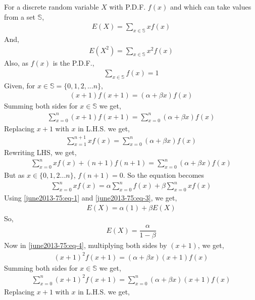For a discrete random variable $X$ with P.D.F. $f(x)$ and which can take values from a set $\mathbb{S}$,
\begin{align} \label{june2013-75:eq-1}
    E(X)= \sum_{x \in \mathbb{S}}xf(x)
\end{align}
And,
\begin{align} \label{june2013-75:eq-2}
    E(X^2) =\sum_{x \in \mathbb{S}}x^2f(x)
\end{align}
Also, as $f(x)$ is the P.D.F.,
\begin{align} \label{june2013-75:eq-3}
    \sum_{x \in \mathbb{S}}f(x) = 1
\end{align}
Given, for $x \in \mathbb{S}=\{0,1,2,...n\}$,
\begin{align} \label{june2013-75:eq-4}
    (x+1)f(x+1)=(\alpha + \beta x)f(x)
\end{align}
Summing both sides for $x \in \mathbb{S}$ we get,
\begin{align}
    \sum_{x=0}^n(x+1)f(x+1)=\sum_{x=0}^n(\alpha +\beta x)f(x)
\end{align}
Replacing $x+1$ with $x$ in L.H.S. we get, 
\begin{align}
    \sum_{x=1}^{n+1}xf(x)=\sum_{x=0}^n(\alpha +\beta x)f(x)
\end{align}
Rewriting LHS, we get,
\begin{align}
    \sum_{x=0}^nxf(x)+(n+1)f(n+1)=\sum_{x=0}^n(\alpha +\beta x)f(x)
\end{align}
But as $x \in \{0,1,2...n\}$, $f(n+1)=0$. So the equation becomes
\begin{align}
    \sum_{x=0}^nxf(x)=\alpha \sum_{x=0}^nf(x) + \beta \sum_{x=0}^nxf(x)
\end{align}
Using \eqref{june2013-75:eq-1} and \eqref{june2013-75:eq-3}, we get,
\begin{align} 
    E(X)=\alpha(1) + \beta E(X)
\end{align}
So,
\begin{align} \label{june2013-75:eq-5}
    E(X)=\dfrac{\alpha}{1-\beta}
\end{align}
Now in \eqref{june2013-75:eq-4}, multiplying both sides by $(x+1)$, we get,
\begin{align}
    (x+1)^2f(x+1)=(\alpha + \beta x)(x+1)f(x)
\end{align}
Summing both sides for $x \in \mathbb{S}$ we get,
\begin{align}
    \sum_{x=0}^n(x+1)^2f(x+1)=\sum_{x=0}^n(\alpha +\beta x)(x+1)f(x)
\end{align}
Replacing $x+1$ with $x$ in L.H.S. we get, 
